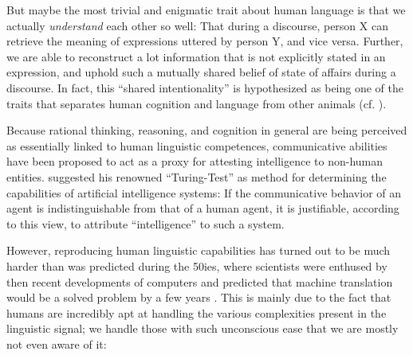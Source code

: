
But maybe the most trivial and enigmatic trait about human language
is that we actually \emph{understand} each other so well: That during
a discourse, person X can retrieve the meaning of expressions uttered
by person Y, and vice versa. Further, we are able to reconstruct a lot
information that is not explicitly stated in an expression, and uphold
such a mutually shared belief of state of affairs during a discourse.
In fact, this ``shared intentionality'' is hypothesized as being one
of the traits that separates human cognition and language from other
animals (cf. \cite{tomasello2007shared}).

Because {\color{red} rational} thinking, reasoning, and cognition in general are being perceived
as essentially linked to human linguistic competences, communicative abilities have been proposed
to act as a proxy for attesting intelligence to non-human entities. \cite{turing1950computing}
suggested his renowned ``Turing-Test'' as method for determining the capabilities of artificial
intelligence systems: If the communicative behavior of an agent is indistinguishable from that of
a human agent, it is justifiable, according to this view, to attribute ``intelligence'' to such a
system.

However, reproducing human linguistic capabilities has turned out to be much harder
than was predicted during the 50ies, where scientists were enthused by then recent
developments of computers and predicted that machine translation would be a solved
problem by a few years \citep{hutchins2005history}. This is mainly due to the fact
that humans are incredibly apt at handling the various complexities present in the
linguistic signal; we handle those with such unconscious ease that we are mostly
not even aware of it:

